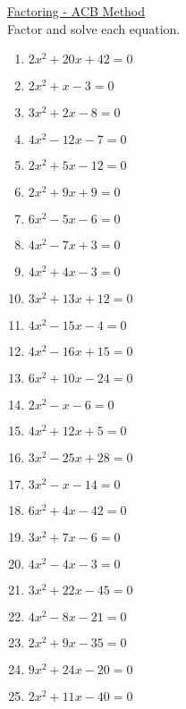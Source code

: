 \documentclass{article}
\begin{document}
\newpage
\underline{Factoring - ACB Method} \\
Factor and solve each equation. \\
\begin{enumerate}
\item $2x^{2} + 20x + 42 = 0$
\item $2x^{2} + x - 3 = 0$
\item $3x^{2} + 2x - 8 = 0$
\item $4x^{2} - 12x - 7 = 0$
\item $2x^{2} + 5x - 12 = 0$
\item $2x^{2} + 9x + 9 = 0$
\item $6x^{2} - 5x - 6 = 0$
\item $4x^{2} - 7x + 3 = 0$
\item $4x^{2} + 4x - 3 = 0$
\item $3x^{2} + 13x + 12 = 0$
\item $4x^{2} - 15x - 4 = 0$
\item $4x^{2} - 16x + 15 = 0$
\item $6x^{2} + 10x - 24 = 0$
\item $2x^{2} - x - 6 = 0$
\item $4x^{2} + 12x + 5 = 0$
\item $3x^{2} - 25x + 28 = 0$
\item $3x^{2} - x - 14 = 0$
\item $6x^{2} + 4x - 42 = 0$
\item $3x^{2} + 7x - 6 = 0$
\item $4x^{2} - 4x - 3 = 0$
\item $3x^{2} + 22x - 45 = 0$
\item $4x^{2} - 8x - 21 = 0$
\item $2x^{2} + 9x - 35 =0$
\item $9x^{2} + 24x - 20 = 0$
\item $2x^{2} + 11x - 40 = 0$
\end{enumerate}
\end{document}
